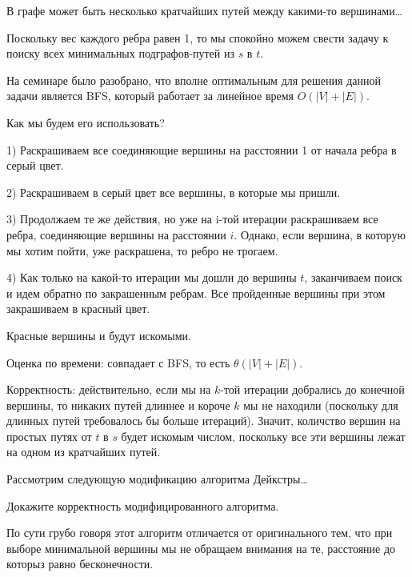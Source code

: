 \documentclass[12pt]{extreport}
\theoremstyle{definiton}
\theoremstyle{definition}
\theoremstyle{definition}
\newcounter{problem}
\newcounter{uproblem}
\newcounter{subproblem}
\def\beforPRskip{
	\bigskip
}
\def\PRSUBskip{
	\medskip
}
\def\pr{\beforPRskip\noindent\stepcounter{problem}{\bf \theproblem .\;}\setcounter{subproblem}{0}}
\def\upr{\beforPRskip\noindent\stepcounter{uproblem}{\bf Упражнение \theuproblem .  }\setcounter{subproblem}{0} }
\def\prsub{\PRSUBskip\noindent\stepcounter{subproblem}{\sf \thesubproblem .} }
\def\prsubr{\PRSUBskip\noindent\stepcounter{subproblem}{\bf \asbuk{subproblem})}\;}
\def\prend{
	\bigskip
}
\begin{document}
	


\pr В графе может быть несколько кратчайших путей между какими-то вершинами\ldots

	Поскольку вес каждого ребра равен 1, то мы спокойно можем свести задачу к поиску всех минимальных подграфов-путей из $s$ в $t$.

	На семинаре было разобрано, что вполне оптимальным для решения данной задачи является BFS, который работает за линейное время $O(|V| + |E|)$.

	Как мы будем его использовать?

	1) Раскрашиваем все соединяющие вершины на расстоянии 1 от начала ребра в серый цвет.

	2) Раскрашиваем в серый цвет все вершины, в которые мы пришли.

	3) Продолжаем те же действия, но уже на i-той итерации раскрашиваем все ребра, соединяющие вершины на расстоянии $i$. Однако, если вершина, в которую мы хотим пойти, уже раскрашена, то ребро не трогаем.

	4) Как только на какой-то итерации мы дошли до вершины $t$, заканчиваем поиск и идем обратно по закрашенным ребрам. Все пройденные вершины при этом закрашиваем в красный цвет.

	Красные вершины и будут искомыми.

	Оценка по времени: совпадает с BFS, то есть $\theta(|V| + |E|)$.

	Корректность: действительно, если мы на $k$-той итерации добрались до конечной вершины, то никаких путей длиннее и короче $k$ мы не находили (поскольку для длинных путей требовалось бы больше итераций).
	Значит, количство вершин на простых путях от $t$ в $s$ будет искомым числом, поскольку все эти вершины лежат на одном из кратчайших путей.

\medskip



\pr Рассмотрим следующую модификацию алгоритма Дейкстры\ldots

\prsub Докажите корректность модифицированного алгоритма. 

	По сути грубо говоря этот алгоритм отличается от оригинального тем, что при выборе минимальной вершины мы не обращаем внимания на те, расстояние до которыз равно бесконечности.
\end{document}
